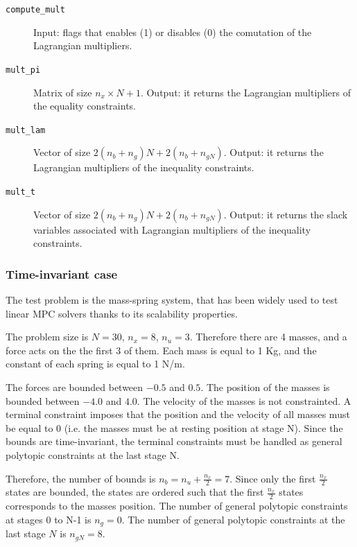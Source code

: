 \documentclass[a4paper]{report}
\begin{document}
\begin{description}
\item[\tt compute\_mult] Input: flags that enables (1) or disables (0) the comutation of the Lagrangian multipliers.

\item[\tt mult\_pi] Matrix of size $n_x \times N+1$.
Output: it returns the Lagrangian multipliers of the equality constraints.

\item[\tt mult\_lam] Vector of size $2(n_b+n_g)N + 2(n_b+n_{gN})$.
Output: it returns the Lagrangian multipliers of the inequality constraints.

\item[\tt mult\_t] Vector of size $2(n_b+n_g)N + 2(n_b+n_{gN})$.
Output: it returns the slack variables associated with Lagrangian multipliers of the inequality constraints.

\end{description}


\subsubsection{Time-invariant case}

The test problem is the mass-spring system, that has been widely used to test linear MPC solvers thanks to its scalability properties.

The problem size is $N=30$, $n_x=8$, $n_u=3$.
Therefore there are 4 masses, and a force acts on the the first 3 of them.
Each mass is equal to 1 Kg, and the constant of each spring is equal to 1 N/m.

The forces are bounded between $-0.5$ and $0.5$.
The position of the masses is bounded between $-4.0$ and $4.0$.
The velocity of the masses is not constrainted.
A terminal constraint imposes that the position and the velocity of all masses must be equal to 0 (i.e. the masses must be at resting position at stage N).
Since the bounds are time-invariant, the terminal constraints must be handled as general polytopic constraints at the last stage N.

Therefore, the number of bounds is $n_b=n_u+\tfrac{n_x} 2 = 7$.
Since only the first $\tfrac{n_x} 2$ states are bounded, the states are ordered such that the first $\tfrac{n_x} 2$ states corresponds to the masses position.
The number of general polytopic constraints at stages 0 to N-1 is $n_g = 0$.
The number of general polytopic constraints at the last stage $N$ is $n_{gN} = 8$.
\end{document}
